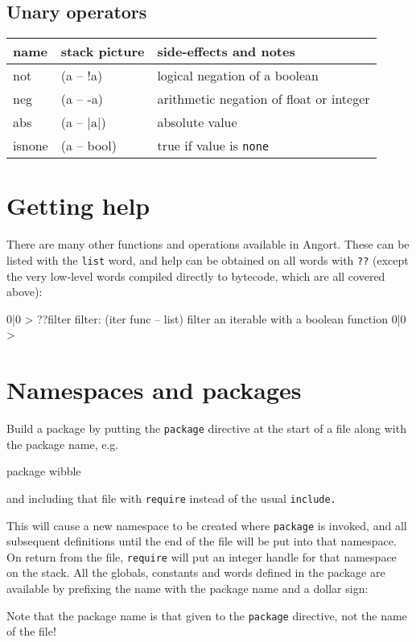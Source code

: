 \subsection{Unary operators}
\begin{center}
\begin{tabular}{|l|l|p{4in}|}\hline
\textbf{name} & \textbf{stack picture} & \textbf{side-effects and notes}\\ \hline
not & (a -- !a) & logical negation of a boolean\\
neg & (a -- -a) & arithmetic negation of float or integer\\
abs & (a -- $|\textrm{a}|$) & absolute value\\
isnone & (a -- bool) & true if value is \texttt{none} \\
\hline
\end{tabular}
\end{center}

\section{Getting help}
There are many other functions and operations available in Angort.
These can be listed with the \texttt{list} word, and help can
be obtained on all words with \texttt{??} (except the very low-level words compiled
directly to bytecode, which are all covered above):
\begin{v}
0|0 > ??filter
filter: (iter func -- list) filter an iterable with a boolean function
0|0 > 
\end{v}

\section{Namespaces and packages}
Build a package by putting the \texttt{package} directive at the start
of a file along with the package name, e.g.
\begin{v}
package wibble
\end{v}

and including that file with \texttt{require} instead of the usual \texttt{include.} 

This will cause a new namespace to be created where \texttt{package} is 
invoked, and all subsequent definitions until the end of the file will
be put into that namespace. On return from the file, \texttt{require} will
put an integer handle for that namespace on the stack. All the globals,
constants and words defined in the package are available by prefixing
the name with the package name and a dollar sign:
Note that the package name is that given to the \texttt{package} directive,
not the name of the file!

